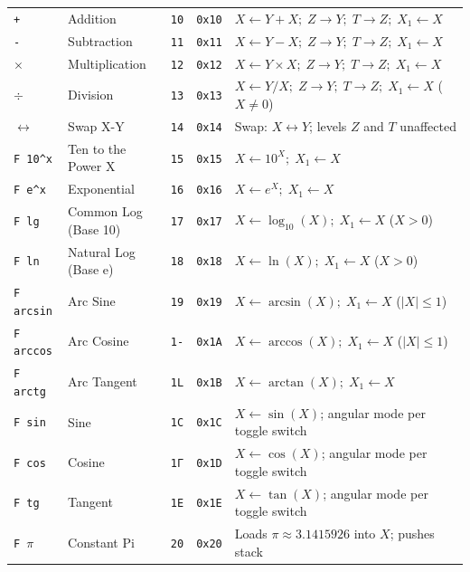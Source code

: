 \documentclass[11pt,a4paper]{article}
\begin{document}
{\begin{longtable}{p{2.2cm}p{3.0cm}>{\centering\arraybackslash}p{1.0cm}>{\centering\arraybackslash}p{1.2cm}p{7.3cm}}
\midrule
\texttt{+} & Addition & \texttt{10} & \texttt{0x10} & $X \leftarrow Y + X;\; Z \to Y;\; T \to Z;\; X_1 \leftarrow X$ \\
\texttt{-} & Subtraction & \texttt{11} & \texttt{0x11} & $X \leftarrow Y - X;\; Z \to Y;\; T \to Z;\; X_1 \leftarrow X$ \\
\texttt{$\times$} & Multiplication & \texttt{12} & \texttt{0x12} & $X \leftarrow Y \times X;\; Z \to Y;\; T \to Z;\; X_1 \leftarrow X$ \\
\texttt{$\div$} & Division & \texttt{13} & \texttt{0x13} & $X \leftarrow Y / X;\; Z \to Y;\; T \to Z;\; X_1 \leftarrow X$ ($X \ne 0$) \\
\texttt{$\leftrightarrow$} & Swap X-Y & \texttt{14} & \texttt{0x14} & Swap: $X \leftrightarrow Y$; levels $Z$ and $T$ unaffected \\
\texttt{F 10\textasciicircum x} & Ten to the Power X & \texttt{15} & \texttt{0x15} & $X \leftarrow 10^X;\; X_1 \leftarrow X$ \\
\texttt{F e\textasciicircum x} & Exponential & \texttt{16} & \texttt{0x16} & $X \leftarrow e^X;\; X_1 \leftarrow X$ \\
\texttt{F lg} & Common Log (Base 10) & \texttt{17} & \texttt{0x17} & $X \leftarrow \log_{10}(X);\; X_1 \leftarrow X$ ($X > 0$) \\
\texttt{F ln} & Natural Log (Base e) & \texttt{18} & \texttt{0x18} & $X \leftarrow \ln(X);\; X_1 \leftarrow X$ ($X > 0$) \\
\texttt{F arcsin} & Arc Sine & \texttt{19} & \texttt{0x19} & $X \leftarrow \arcsin(X);\; X_1 \leftarrow X$ ($|X| \le 1$) \\
\texttt{F arccos} & Arc Cosine & \texttt{1-} & \texttt{0x1A} & $X \leftarrow \arccos(X);\; X_1 \leftarrow X$ ($|X| \le 1$) \\
\texttt{F arctg} & Arc Tangent & \texttt{1L} & \texttt{0x1B} & $X \leftarrow \arctan(X);\; X_1 \leftarrow X$ \\
\texttt{F sin} & Sine & \texttt{1C} & \texttt{0x1C} & $X \leftarrow \sin(X)$; angular mode per toggle switch \\
\texttt{F cos} & Cosine & \texttt{1Г} & \texttt{0x1D} & $X \leftarrow \cos(X)$; angular mode per toggle switch \\
\texttt{F tg} & Tangent & \texttt{1E} & \texttt{0x1E} & $X \leftarrow \tan(X)$; angular mode per toggle switch \\
\midrule
\texttt{F $\pi$} & Constant Pi & \texttt{20} & \texttt{0x20} & Loads $\pi \approx 3.1415926$ into $X$; pushes stack \\

\end{longtable}}
\end{document}
